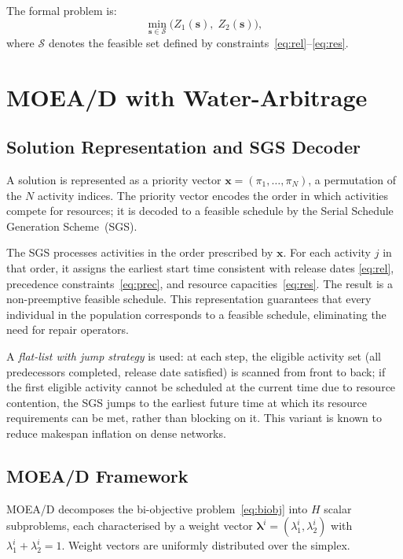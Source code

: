 \documentclass[12pt,a4paper]{article}
\newcommand{\Z}[1]{Z_{#1}}
\newcommand{\bx}{\mathbf{x}}
\newcommand{\blam}{\boldsymbol{\lambda}}
\begin{document}
The formal problem is:
\begin{equation}
  \min_{\mathbf{s} \in \mathcal{S}} \bigl(\Z{1}(\mathbf{s}),\; \Z{2}(\mathbf{s})\bigr),
  \label{eq:biobj}
\end{equation}
where $\mathcal{S}$ denotes the feasible set defined by
constraints~\eqref{eq:rel}--\eqref{eq:res}.

\section{MOEA/D with Water-Arbitrage}
\label{sec:algo}

\subsection{Solution Representation and SGS Decoder}
\label{sec:algo:rep}

A solution is represented as a priority vector $\bx = (\pi_1,\ldots,\pi_N)$, a
permutation of the $N$ activity indices.  The priority vector encodes the order in
which activities compete for resources; it is decoded to a feasible schedule by the
Serial Schedule Generation Scheme~(SGS).

The SGS processes activities in the order prescribed by $\bx$.  For each activity
$j$ in that order, it assigns the earliest start time consistent with release dates
\eqref{eq:rel}, precedence constraints~\eqref{eq:prec}, and resource
capacities~\eqref{eq:res}.  The result is a non-preemptive feasible schedule.  This
representation guarantees that every individual in the population corresponds to a
feasible schedule, eliminating the need for repair operators.

A \emph{flat-list with jump strategy} \citep{Goncalves2008} is used: at each step,
the eligible activity set (all predecessors completed, release date satisfied) is
scanned from front to back; if the first eligible activity cannot be scheduled at
the current time due to resource contention, the SGS jumps to the earliest future
time at which its resource requirements can be met, rather than blocking on it.
This variant is known to reduce makespan inflation on dense networks.

\subsection{MOEA/D Framework}
\label{sec:algo:moead}

MOEA/D \citep{Zhang2007} decomposes the bi-objective problem~\eqref{eq:biobj} into
$H$ scalar subproblems, each characterised by a weight vector
$\blam^i = (\lambda_1^i, \lambda_2^i)$ with $\lambda_1^i + \lambda_2^i = 1$.
Weight vectors are uniformly distributed over the simplex.
\end{document}
